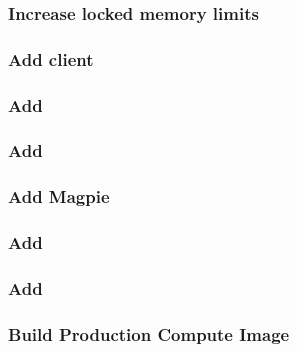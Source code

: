 \documentclass{ohpc-doc}
\begin{document}

\subsubsection{Increase locked memory limits}


\subsubsection{Add \Lustre{} client}\label{sec:lustre_client}





\subsubsection{Add \clustershell{}}


\subsubsection{Add \genders{}}


\subsubsection{Add Magpie}



\subsubsection{Add \conman{}} \label{sec:add_conman}


\subsubsection{Add \nhc{}} \label{sec:add_nhc}




\subsubsection{Build Production Compute Image}

\end{document}
